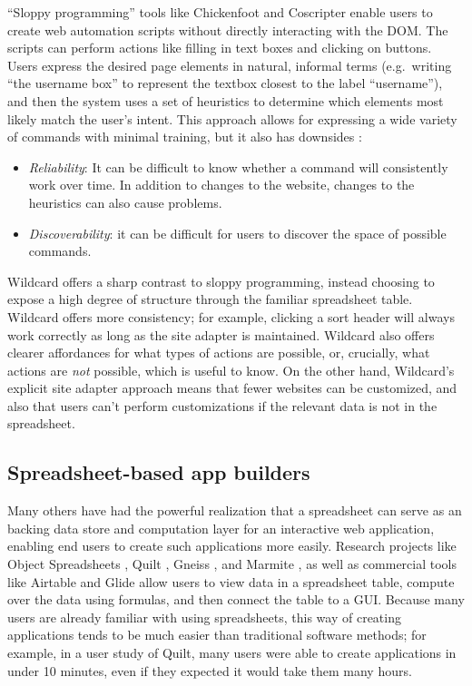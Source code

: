 \documentclass[english,submission]{programming}
\providecommand{\tightlist}{%
  \setlength{\itemsep}{0pt}\setlength{\parskip}{0pt}}
\begin{document}
``Sloppy programming'' \autocite{little2010} tools like Chickenfoot
\autocite{bolin2005} and Coscripter \autocite{leshed2008} enable users
to create web automation scripts without directly interacting with the
DOM. The scripts can perform actions like filling in text boxes and
clicking on buttons. Users express the desired page elements in natural,
informal terms (e.g.~writing ``the username box'' to represent the
textbox closest to the label ``username''), and then the system uses a
set of heuristics to determine which elements most likely match the
user's intent. This approach allows for expressing a wide variety of
commands with minimal training, but it also has downsides
\autocite{little2010}:

\begin{itemize}
\tightlist
\item
  \emph{Reliability}: It can be difficult to know whether a command will
  consistently work over time. In addition to changes to the website,
  changes to the heuristics can also cause problems.
\item
  \emph{Discoverability}: it can be difficult for users to discover the
  space of possible commands.
\end{itemize}

Wildcard offers a sharp contrast to sloppy programming, instead choosing
to expose a high degree of structure through the familiar spreadsheet
table. Wildcard offers more consistency; for example, clicking a sort
header will always work correctly as long as the site adapter is
maintained. Wildcard also offers clearer affordances for what types of
actions are possible, or, crucially, what actions are \emph{not}
possible, which is useful to know. On the other hand, Wildcard's
explicit site adapter approach means that fewer websites can be
customized, and also that users can't perform customizations if the
relevant data is not in the spreadsheet.

\hypertarget{spreadsheet-based-app-builders}{%
\subsection{Spreadsheet-based app
builders}\label{spreadsheet-based-app-builders}}

Many others have had the powerful realization that a spreadsheet can
serve as an backing data store and computation layer for an interactive
web application, enabling end users to create such applications more
easily. Research projects like Object Spreadsheets
\autocite{mccutchen2016}, Quilt \autocite{benson2014}, Gneiss
\autocite{chang2014}, and Marmite \autocite{wong2007}, as well as
commercial tools like Airtable \autocite{zotero-79} and Glide
\autocite{zotero-81} allow users to view data in a spreadsheet table,
compute over the data using formulas, and then connect the table to a
GUI. Because many users are already familiar with using spreadsheets,
this way of creating applications tends to be much easier than
traditional software methods; for example, in a user study of Quilt,
many users were able to create applications in under 10 minutes, even if
they expected it would take them many hours.
\end{document}
